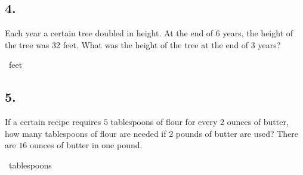 \documentclass[12pt]{article}
\begin{document}
\subsection*{4.}
Each year a certain tree doubled in height. At the end of $6$ years, the height of the tree was 32 feet. What was the height of the tree at the end of $3$ years?

\fbox{\phantom{ANSWER}}~feet

\begin{answer}
%
\end{answer}



\subsection*{5.}
If a certain recipe requires $5$ tablespoons of flour for every $2$ ounces of butter, how many tablespoons of flour are needed if $2$ pounds of butter are used? There are $16$ ounces of butter in one pound. 

\fbox{\phantom{ANSWER}}~tablespoons
\end{document}

